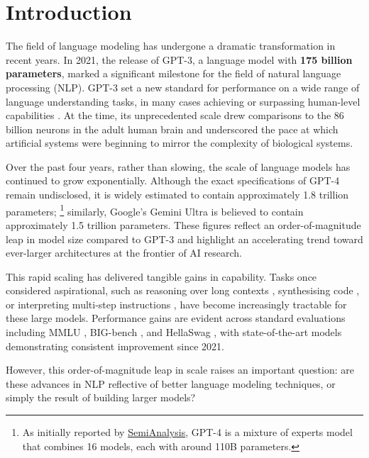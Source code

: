 \chapter{Introduction}

The field of language modeling has undergone a dramatic transformation in recent years. In 2021, the release of GPT-3, a language model with \textbf{175 billion parameters}, marked a significant milestone for the field of natural language processing (NLP). GPT-3 set a new standard for performance on a wide range of language understanding tasks, in many cases achieving or surpassing human-level capabilities \citep{brown2020gpt3}. At the time, its unprecedented scale drew comparisons to the 86 billion neurons in the adult human brain \citep{azevedo2009neurons} and underscored the pace at which artificial systems were beginning to mirror the complexity of biological systems.

Over the past four years, rather than slowing, the scale of language models has continued to grow exponentially. Although the exact specifications of GPT-4 remain undisclosed, it is widely estimated to contain approximately 1.8 trillion parameters; \footnote{As initially reported by \href{https://semianalysis.com/2023/07/10/gpt-4-architecture-infrastructure/}{SemiAnalysis}, GPT-4 is a mixture of experts model that combines 16 models, each with around 110B parameters.} similarly, Google's Gemini Ultra is believed to contain approximately 1.5 trillion parameters. These figures reflect an order-of-magnitude leap in model size compared to GPT-3 and highlight an accelerating trend toward ever-larger architectures at the frontier of AI research.

This rapid scaling has delivered tangible gains in capability. Tasks once considered aspirational, such as reasoning over long contexts \citep{lewis2020retrieval}, synthesising code \citep{chen2021evaluating}, or interpreting multi-step instructions \citep{wei2022chain}, have become increasingly tractable for these large models. Performance gains are evident across standard evaluations including MMLU \citep{hendrycks2021mmlu}, BIG-bench \citep{srivastava2023bigbench}, and HellaSwag \citep{zellers2019hellaswag}, with state-of-the-art models demonstrating consistent improvement since 2021.

However, this order-of-magnitude leap in scale raises an important question: are these advances in NLP reflective of better language modeling techniques, or simply the result of building larger models? 

